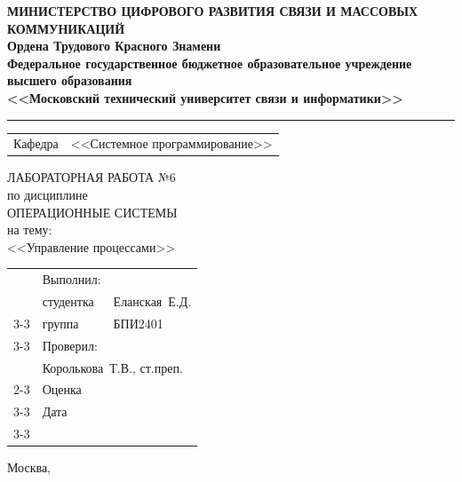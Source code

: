 \thispagestyle{empty}

\begin{center}
	\textbf{МИНИСТЕРСТВО ЦИФРОВОГО РАЗВИТИЯ СВЯЗИ И МАССОВЫХ КОММУНИКАЦИЙ} \\
	\textbf{Ордена Трудового Красного Знамени \\
		Федеральное государственное бюджетное образовательное учреждение высшего образования \\
		<<Московский технический университет связи и информатики>>}
\end{center}
\rule{\linewidth}{1pt}

\vspace{0.3em}

\begin{center}
	\begin{tabularx}{0.6\textwidth}{p{1.2cm}X}
		Кафедра & \quad <<Системное программирование>> \\%
	\end{tabularx}
\end{center}

\vspace{10em}

\begin{center}
	\Large
	ЛАБОРАТОРНАЯ РАБОТА №6 \\
	\large
	по дисциплине \\
	ОПЕРАЦИОННЫЕ СИСТЕМЫ \\
	на тему: \\
	<<Управление процессами>>
\end{center}

\vspace{4em}

\renewcommand{\arraystretch}{1.1}
\begin{tabularx}{\textwidth}{p{10cm}p{2cm}p{3cm}}
	& Выполнил: & \\
	& студентка & Еланская~Е.Д. \\\cline{3-3} 
	& группа & БПИ2401 \\\cline{3-3} 
	& Проверил: &  \\
	& \multicolumn{2}{l}{Королькова~Т.В., ст.преп.} \\\cline{2-3}
	& Оценка & \\\cline{3-3} 
	& Дата & \\\cline{3-3} 
\end{tabularx}

\vspace{5em}

\begin{center}
	Москва,~\the\year
\end{center}
\clearpage

